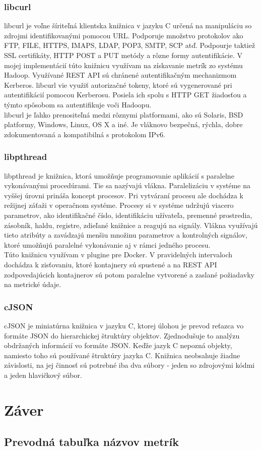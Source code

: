 \documentclass[12pt,twoside,color,cover,table]{fithesis3}
\begin{document}
\subsection{libcurl}
libcurl je voľne šíriteľná klientska knižnica v jazyku C určená na manipuláciu so zdrojmi identifikovanými pomocou URL. Podporuje
množstvo protokolov ako FTP, FILE, HTTPS, IMAPS, LDAP, POP3, SMTP, SCP atď. Podpourje taktiež SSL certifikáty,
HTTP POST a PUT metódy a rôzne formy autentifikácie. V mojej implementácií túto knižnicu využívam na získavanie metrík zo systému
Hadoop. Využívané REST API sú chránené autentifikačným mechanizmom Kerberos. libcurl vie využiť autorizačné tokeny,
ktoré sú vygenerované pri autentifikácií pomocou Kerberosu. Posiela ich spolu s HTTP GET žiadosťou a týmto spôsobom
sa autentifikuje voči Hadoopu.
\\libcurl je ľahko prenositeľná medzi rôznymi platformami, ako sú Solaris, BSD platformy, Windows, Linux, OS X a iné. Je vláknovo
bezpečná, rýchla, dobre zdokumentovaná a kompatibilná s protokolom IPv6. %

\subsection{libpthread}
libpthread je knižnica, ktorá umožňuje programovanie aplikácií s paralelne vykonávanými procedúrami. Tie sa nazývajú vlákna. Paralelizáciu
v systéme na vyššej úrovni prináša koncept procesov. Pri
vytváraní procesu ale dochádza k režijnej záťaži v operačnom systéme. Procesy si v systéme udržujú viacero parametrov, ako identifikačné
číslo, identifikáciu užívateľa, premenné prostredia, zásobník, haldu, registre, zdieľané knižnice a reagujú na signály. Vlákna využívajú
tieto atribúty a zavádzajú menšiu množinu parametrov a kontrolných signálov, ktoré umožňujú paralelné vykonávanie aj v rámci jedného procesu.
\\Túto knižnicu využívam v plugine pre Docker. V pravidelných intervaloch dochádza k zisťovaniu, ktoré kontajnery sú spustené a na REST API
zodpovedajúcich kontajnerov sú potom paralelne vytvorené a zaslané požiadavky na metrické údaje.

\subsection{cJSON}
cJSON je miniatúrna knižnica v jazyku C, ktorej úlohou je prevod reťazca vo formáte JSON do hierarchickej štruktúry objektov. Zjednodušuje
to analýzu obdržaných informácií vo formáte JSON. Keďže jazyk C nepozná objekty, namiesto toho sú používané štruktúry jazyka C. 
Knižnica neobsahuje žiadne závislosti, na jej činnosť sú potrebné iba dva súbory - jeden so zdrojovými kódmi a jeden hlavičkový súbor.

\chapter{Záver}

\printbibliography[heading=bibintoc]

\begin{appendices}
\chapter{Prevodná tabuľka názvov metrík}
\end{appendices}
\end{document}

